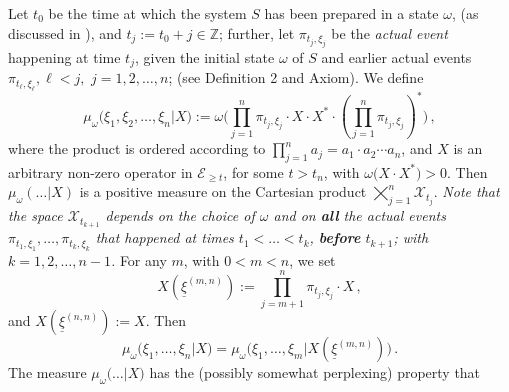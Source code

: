 \documentclass[a4paper,11pt]{article}
\begin{document}
Let $t_0$ be the time at which the system $S$ has been prepared in a state $\omega$, (as discussed in \cite{FS-state-prep}), and $t_j:=t_0 + j \in \mathbb{Z}$; further, let $\pi_{t_j, \xi_j}$ be the \textit{actual event} happening at time $t_j$, given the initial state $\omega$ of $S$ and earlier actual events $\pi_{t_\ell, \xi_{\ell}}, \ell < j,$ $j=1,2, \dots, n$; (see Definition 2 and Axiom). We define 
\begin{equation}\label{Mu_omega}
\mu_{\omega}\big(\xi_1, \xi_2, \dots, \xi_n\vert X\big):= \omega\Big(\prod_{j=1}^{n} \pi_{t_j, \xi_j}\cdot X\cdot X^{*} \cdot (\prod_{j=1}^{n}\pi_{t_j, \xi_j})^{*}\Big)\,,
\end{equation}
where the product is ordered according to $\prod_{j=1}^{n} a_{j} = a_1 \cdot a_2 \cdots a_n$, and $X$ is an arbitrary non-zero operator in $\mathcal{E}_{\geq t}$, for some $t> t_n$, with $\omega\big(X\cdot X^{*}\big)>0$.
Then $\mu_{\omega}(\dots \vert X)$ is a positive measure on the Cartesian product ${\bigtimes}_{j=1}^{n} \mathcal{X}_{t_j}$. \textit{Note that the space $\mathcal{X}_{t_{k+1}}$ depends on the choice of $\omega$ and on {\bf{all}} the actual events $\pi_{t_1,\xi_1}, \dots, \pi_{t_{k},\xi_{k}}$ that happened at times $t_1 <\dots < t_k$, {\bf{before}} $t_{k+1}$; with $k=1,2, \dots, n-1$.} For any $m$, with $0<m<n$, we set
$$X(\underline{\xi}^{(m,n)}):= \prod_{j=m+1}^{n} \pi_{t_j, \xi_j} \cdot X\,,$$
and $X(\underline{\xi}^{(n,n)}):=X$. Then 
$$\mu_{\omega}\big(\xi_1,\dots,\xi_n \vert X\big)= \mu_{\omega}\big(\xi_1, \dots, \xi_m \vert X(\underline{\xi}^{(m,n)})\big)\,.$$
The measure 
$\mu_{\omega}\big(\dots \vert X\big)$ has the (possibly somewhat perplexing) property that\\
\end{document}
